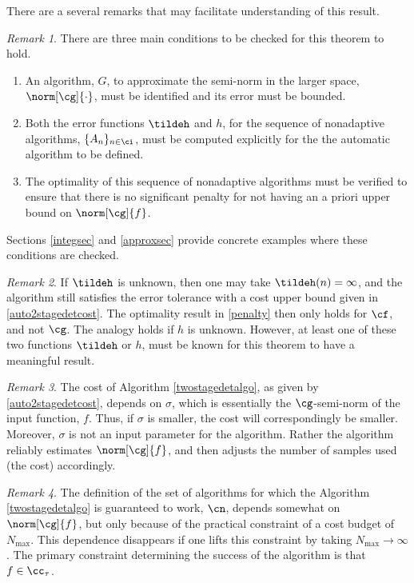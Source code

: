 \documentclass[]{elsarticle}
\theoremstyle{definition}
\theoremstyle{remark}
\newtheorem{rem}{Remark}
\begin{document}
There are a several remarks that may facilitate understanding of this result.

\begin{rem} There are three main conditions to be checked for this theorem to hold.
\begin{enumerate}
\renewcommand{\labelenumi}{\roman{enumi}.}
\item An algorithm, $G$, to approximate the semi-norm in the larger space,  $\norm[\cg]{\cdot}$,  must be identified and its error must be bounded.
\item Both the error functions $\tildeh$ and $h$, for the sequence of nonadaptive algorithms, $\{A_n\}_{n \in \ci}$, must be computed explicitly for the the automatic algorithm to be defined.  
\item The optimality of this sequence of nonadaptive algorithms must be verified to ensure that there is no significant penalty for not having an a priori upper bound on $\norm[\cg]{f}$.
\end{enumerate}
Sections \ref{integsec} and \ref{approxsec} provide concrete examples where these conditions are checked.
\end{rem}

\begin{rem} If $\tildeh$ is unknown, then one may take $\tildeh(n)=\infty$, and the algorithm still satisfies the error tolerance with a cost upper bound given in \eqref{auto2stagedetcost}.  The optimality result in \eqref{penalty} then only holds for $\cf$, and not $\cg$.  The analogy holds if $h$ is unknown.  However, at least one of these two functions $\tildeh$ or $h$, must be known for this theorem to have a meaningful result.
\end{rem}

\begin{rem} The cost of Algorithm \ref{twostagedetalgo}, as given by \eqref{auto2stagedetcost}, depends on $\sigma$, which is essentially the $\cg$-semi-norm of the input function, $f$.  Thus, if $\sigma$ is smaller, the cost will correspondingly be smaller.  Moreover, $\sigma$ is not an input parameter for the algorithm.  Rather the algorithm reliably estimates $\norm[\cg]{f}$, and then adjusts the number of samples used (the cost) accordingly.
\end{rem}

\begin{rem}
The definition of the set of algorithms for which the Algorithm \ref{twostagedetalgo} is guaranteed to work, $\cn$, depends somewhat on $\norm[\cg]{f}$, but only because of the practical constraint of a cost budget of $N_{\max}$.  This dependence disappears if one lifts this constraint by taking $N_{\max} \to \infty$.  The primary constraint determining the success of the algorithm is that $f \in \cc_{\tau}$.
\end{rem}
\end{document}
